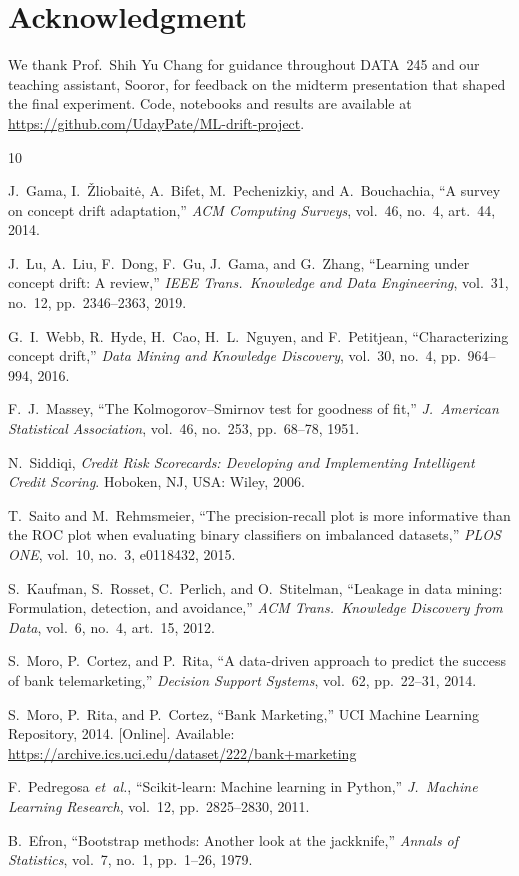 \documentclass[conference]{IEEEtran}
\begin{document}
\section*{Acknowledgment}
We thank Prof.\ Shih Yu Chang for guidance throughout DATA~245 and our teaching assistant, Sooror, for feedback on the midterm presentation that shaped the final experiment. Code, notebooks and results are available at \url{https://github.com/UdayPate/ML-drift-project}.

\begin{thebibliography}{10}

J.~Gama, I.~\v{Z}liobait\.{e}, A.~Bifet, M.~Pechenizkiy, and A.~Bouchachia, ``A survey on concept drift adaptation,'' \emph{ACM Computing Surveys}, vol.~46, no.~4, art.~44, 2014.

J.~Lu, A.~Liu, F.~Dong, F.~Gu, J.~Gama, and G.~Zhang, ``Learning under concept drift: A review,'' \emph{IEEE Trans.\ Knowledge and Data Engineering}, vol.~31, no.~12, pp.~2346--2363, 2019.

G.~I.~Webb, R.~Hyde, H.~Cao, H.~L.~Nguyen, and F.~Petitjean, ``Characterizing concept drift,'' \emph{Data Mining and Knowledge Discovery}, vol.~30, no.~4, pp.~964--994, 2016.

F.~J.~Massey, ``The Kolmogorov--Smirnov test for goodness of fit,'' \emph{J.\ American Statistical Association}, vol.~46, no.~253, pp.~68--78, 1951.

N.~Siddiqi, \emph{Credit Risk Scorecards: Developing and Implementing Intelligent Credit Scoring}. Hoboken, NJ, USA: Wiley, 2006.

T.~Saito and M.~Rehmsmeier, ``The precision-recall plot is more informative than the ROC plot when evaluating binary classifiers on imbalanced datasets,'' \emph{PLOS ONE}, vol.~10, no.~3, e0118432, 2015.

S.~Kaufman, S.~Rosset, C.~Perlich, and O.~Stitelman, ``Leakage in data mining: Formulation, detection, and avoidance,'' \emph{ACM Trans.\ Knowledge Discovery from Data}, vol.~6, no.~4, art.~15, 2012.

S.~Moro, P.~Cortez, and P.~Rita, ``A data-driven approach to predict the success of bank telemarketing,'' \emph{Decision Support Systems}, vol.~62, pp.~22--31, 2014.

S.~Moro, P.~Rita, and P.~Cortez, ``Bank Marketing,'' UCI Machine Learning Repository, 2014. [Online]. Available: \url{https://archive.ics.uci.edu/dataset/222/bank+marketing}

F.~Pedregosa \emph{et~al.}, ``Scikit-learn: Machine learning in Python,'' \emph{J.\ Machine Learning Research}, vol.~12, pp.~2825--2830, 2011.

B.~Efron, ``Bootstrap methods: Another look at the jackknife,'' \emph{Annals of Statistics}, vol.~7, no.~1, pp.~1--26, 1979.

\end{thebibliography}
\end{document}

